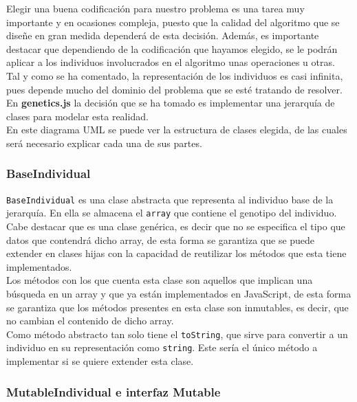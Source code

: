 Elegir una buena codificación para nuestro problema es una tarea muy importante y en ocasiones compleja, puesto que la calidad del algoritmo que se diseñe en gran medida dependerá de esta decisión. Además, es importante destacar que dependiendo de la codificación que hayamos elegido, se le podrán aplicar a los individuos involucrados en el algoritmo unas operaciones u otras. \\

Tal y como se ha comentado, la representación de los individuos es casi infinita, pues depende mucho del dominio del problema que se esté tratando de resolver. En \textbf{genetics.js} la decisión que se ha tomado es implementar una jerarquía de clases para modelar esta realidad. \\

En este diagrama UML se puede ver la estructura de clases elegida, de las cuales será necesario explicar cada una de sus partes.

\subsubsection{BaseIndividual}

\texttt{BaseIndividual} es una clase abstracta que representa al individuo base de la jerarquía. En ella se almacena el \texttt{array} que contiene el genotipo del individuo.
Cabe destacar que es una clase genérica, es decir que no se especifica el tipo que datos que contendrá dicho array, de esta forma se garantiza que se puede extender en clases hijas con la capacidad de reutilizar los métodos que esta tiene implementados. \\

Los métodos con los que cuenta esta clase son aquellos que implican una búsqueda en un array y que ya están implementados en JavaScript, de esta forma se garantiza que los métodos presentes en esta clase son inmutables, es decir, que no cambian el contenido de dicho array. \\

Como método abstracto tan solo tiene el \texttt{toString}, que sirve para convertir a un individuo en su representación como \texttt{string}. Este sería el único método a implementar si se quiere extender esta clase.

\subsubsection{MutableIndividual e interfaz Mutable}

